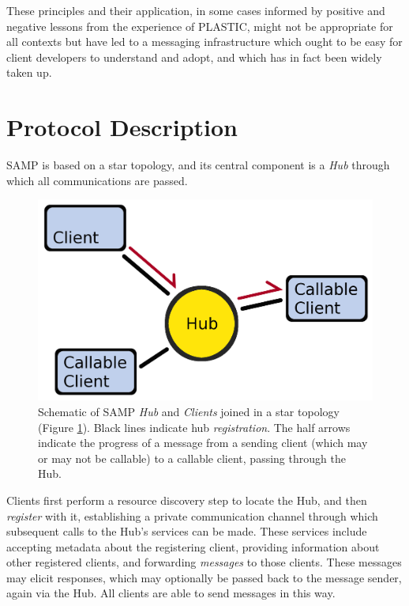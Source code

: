 \documentclass[5p]{elsarticle}
\begin{document}
These principles and their application, in some cases informed
by positive and negative lessons from the experience of PLASTIC,
might not be appropriate for all contexts
but have led to a messaging infrastructure
which ought to be easy for client developers to understand and adopt,
and which has in fact been widely taken up.

\section{Protocol Description} \label{sec:protocol}

SAMP is based on a star topology, and its central component is a
{\em Hub\/} through which all communications are passed.
\begin{figure}
\begin{center}
\includegraphics[width=0.9\columnwidth]{topology-a.png}
\end{center}
\caption{\label{fig:topology}
Schematic of SAMP {\em Hub\/} and {\em Clients\/} joined
in a star topology (Figure \ref{fig:topology}).
Black lines indicate hub {\em registration\/}.
The half arrows indicate the progress of a message
from a sending client (which may or may not be callable)
to a callable client, passing through the Hub.
}
\end{figure}
Clients first perform a resource discovery step to locate the Hub,
and then {\em register\/} with it, establishing a private communication
channel through which subsequent calls to the Hub's services can be made.
These services include accepting metadata about the registering client,
providing information about other registered clients,
and forwarding {\em messages\/} to those clients.
These messages may elicit responses, which may optionally be passed
back to the message sender, again via the Hub.
All clients are able to send messages in this way.
\end{document}
